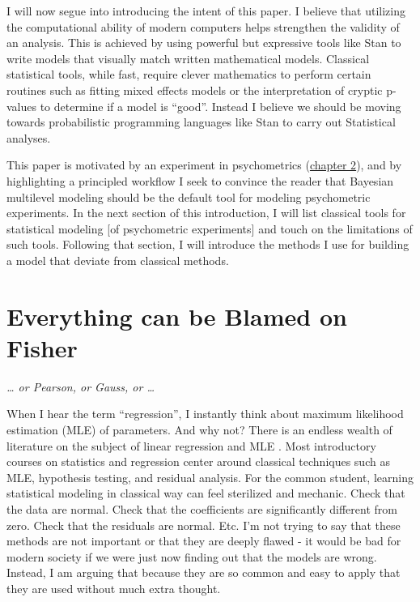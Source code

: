 \documentclass[11pt, oneside, openany]{scrbook}
\begin{document}
I will now segue into introducing the intent of this paper. I believe that utilizing the computational ability of modern computers helps strengthen the validity of an analysis. This is achieved by using powerful but expressive tools like Stan to write models that visually match written mathematical models. Classical statistical tools, while fast, require clever mathematics to perform certain routines such as fitting mixed effects models or the interpretation of cryptic p-values to determine if a model is ``good''. Instead I believe we should be moving towards probabilistic programming languages like Stan to carry out Statistical analyses.

This paper is motivated by an experiment in psychometrics (\protect\hyperlink{motivating-data}{chapter 2}), and by highlighting a principled workflow I seek to convince the reader that Bayesian multilevel modeling should be the default tool for modeling psychometric experiments. In the next section of this introduction, I will list classical tools for statistical modeling {[}of psychometric experiments{]} and touch on the limitations of such tools. Following that section, I will introduce the methods I use for building a model that deviate from classical methods.

\hypertarget{ch010-classical-methods}{%
\section{Everything can be Blamed on Fisher}\label{ch010-classical-methods}}

\emph{\ldots{} or Pearson, or Gauss, or \ldots{}}

When I hear the term ``regression'', I instantly think about maximum likelihood estimation (MLE) of parameters. And why not? There is an endless wealth of literature on the subject of linear regression and MLE \citep{johnson2002applied, larsen2005introduction, sheather2009modern, navidi2015statistics}. Most introductory courses on statistics and regression center around classical techniques such as MLE, hypothesis testing, and residual analysis. For the common student, learning statistical modeling in classical way can feel sterilized and mechanic. Check that the data are normal. Check that the coefficients are significantly different from zero. Check that the residuals are normal. Etc. I'm not trying to say that these methods are not important or that they are deeply flawed - it would be bad for modern society if we were just now finding out that the models are wrong. Instead, I am arguing that because they are so common and easy to apply that they are used without much extra thought.
\end{document}
